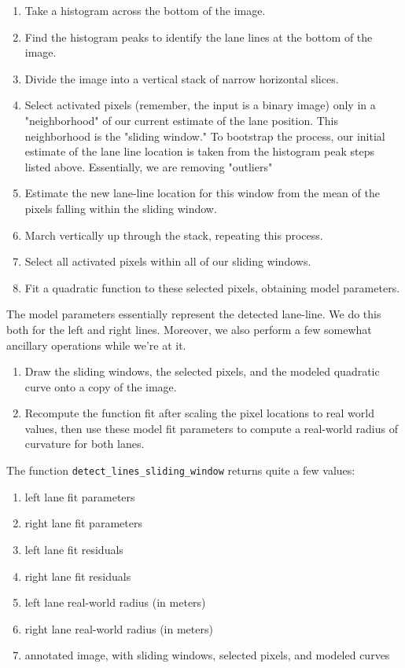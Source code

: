 \documentclass[11pt]{article}
\begin{document}
\begin{enumerate}
\item Take a histogram across the bottom of the image.
\item Find the histogram peaks to identify the lane lines at the
bottom of the image.
\item Divide the image into a vertical stack of narrow horizontal
slices.
\item Select activated pixels (remember, the input is a binary
image) only in a "neighborhood" of our current estimate of
the lane position.  This neighborhood is the "sliding
window."  To bootstrap the process, our initial estimate of
the lane line location is taken from the histogram peak steps
listed above.  Essentially, we are removing "outliers"
\item Estimate the new lane-line location for this window from the
mean of the pixels falling within the sliding window.
\item March vertically up through the stack, repeating this process.
\item Select all activated pixels within all of our sliding windows.
\item Fit a quadratic function to these selected pixels, obtaining
model parameters.
\end{enumerate}

The model parameters essentially represent the detected
lane-line.  We do this both for the left and right lines.
Moreover, we also perform a few somewhat ancillary operations
while we're at it.

\begin{enumerate}
\item Draw the sliding windows, the selected pixels, and the
modeled quadratic curve onto a copy of the image.
\item Recompute the function fit after scaling the pixel locations
to real world values, then use these model fit parameters to
compute a real-world radius of curvature for both lanes.
\end{enumerate}

The function \texttt{detect\_lines\_sliding\_window} returns quite a few values:

\begin{enumerate}
\item left lane fit parameters
\item right lane fit parameters
\item left lane fit residuals
\item right lane fit residuals
\item left lane real-world radius (in meters)
\item right lane real-world radius (in meters)
\item annotated image, with sliding windows, selected pixels, and
modeled curves
\end{enumerate}
\end{document}
